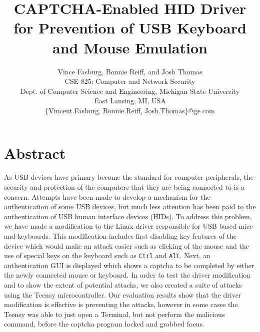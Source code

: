 \documentclass[pagenumbers]{ieee}
\begin{document}
\title{CAPTCHA-Enabled HID Driver \\ for Prevention of USB Keyboard and Mouse Emulation\\}

\author{Vince Fasburg, Bonnie Reiff, and Josh Thomas\\
CSE 825: Computer and Network Security\\
Dept. of Computer Science and Engineering, Michigan State University\\
East Lansing, MI, USA\\
\{Vincent.Fasburg, Bonnie.Reiff, Josh.Thomas\}@ge.com\\
}

\maketitle
\thispagestyle{empty}


\section{Abstract}
\label{section:abstract}

As USB devices have primary become the standard for computer peripherals, the security and protection of the computers that they are being connected to is a concern. Attempts have been made to develop a mechanism for the authentication of some USB devices, but much less attention has been paid to the authentication of USB human interface devices (HIDs). To address this problem, we have made a modification to the Linux driver responsible for USB based mice and keyboards. This modification includes first disabling key features of the device which would make an attack easier such as clicking of the mouse and the use of special keys on the keyboard such as \texttt{Ctrl} and \texttt{Alt}. Next, an authentication GUI is displayed which shows a captcha to be completed by either the newly connected mouse or keyboard. In order to test the driver modification and to show the extent of potential attacks, we also created a suite of attacks using the Teensy microcontroller. Our evaluation results show that the driver modification is effective is preventing the attacks, however in some cases the Teensy was able to just open a Terminal, but not perform the malicious command, before the captcha program locked and grabbed focus.

\end{document}

